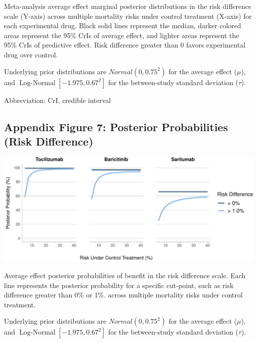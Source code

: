 \documentclass[
  12pt,
]{article}
\begin{document}
Meta-analysis average effect marginal posterior distributions in the
risk difference scale (Y-axis) across multiple mortality risks under
control treatment (X-axis) for each experimental drug. Black solid lines
represent the median, darker colored areas represent the 95\% CrIs of
average effect, and lighter areas represent the 95\% CrIs of predictive
effect. Risk difference greater than 0 favors experimental drug over
control.

Underlying prior distributions are \(Normal(0, 0.75^2)\) for the average
effect (\(\mu\)), and \(\operatorname{Log-Normal}[-1.975, 0.67^2]\) for
the between-study standard deviation (\(\tau\)).

Abbreviation: CrI, credible interval

\newpage

\hypertarget{appendix-figure-7-posterior-probabilities-risk-difference}{%
\subsection{Appendix Figure 7: Posterior Probabilities (Risk
Difference)}\label{appendix-figure-7-posterior-probabilities-risk-difference}}

\begin{center}\includegraphics{supplementary_material_files/figure-latex/RD probabilities plot-1} \end{center}

Average effect posterior probabilities of benefit in the risk difference
scale. Each line represents the posterior probability for a specific
cut-point, such as risk difference greater than 0\% or 1\%. across
multiple mortality risks under control treatment.

Underlying prior distributions are \(Normal(0, 0.75^2)\) for the average
effect (\(\mu\)), and \(\operatorname{Log-Normal}[-1.975, 0.67^2]\) for
the between-study standard deviation (\(\tau\)).

\newpage
\end{document}

